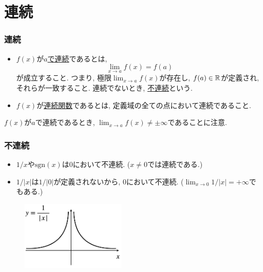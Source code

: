 
\section{連続}

\begin{frame}
\frametitle{連続} 


\begin{Def}
\begin{itemize}
\item $f(x)$が\underline{$a$で連続}であるとは, 
$$
\lim_{x\to a}f(x)=f(a)
$$
が成立すること. 
つまり, 極限$\displaystyle \lim_{x\to a}f(x)$が存在し, $f(a) \in \mathbb{R}$が定義され, それらが一致すること. 
連続でないとき, \underline{不連続}という. 
\item $f(x)$が\underline{連続関数}であるとは, 定義域の全ての点において連続であること. 
\end{itemize}
\end{Def}

$f(x)$が$a$で連続であるとき, $\displaystyle \lim_{x\to a}f(x) \neq \pm  \infty$であることに注意. 

\end{frame}





\begin{frame}
\frametitle{不連続} 



\begin{itemize}
\item  $1/x$や$\mathrm{sgn}(x)$は$0$において不連続. ($x\neq 0$では連続である.) 
\item $1/|x|$は$1/|0|$が定義されないから, $0$において不連続. ($\displaystyle \lim_{x\to 0}1/|x|=+\infty$でもある.)
\end{itemize}



 \begin{figure}[htbp]
 \begin{center} 
  \includegraphics[width=50mm]{calculus3/xinv_abs.png}
 \end{center}
\end{figure}

\vspace{-1mm}


\end{frame}



